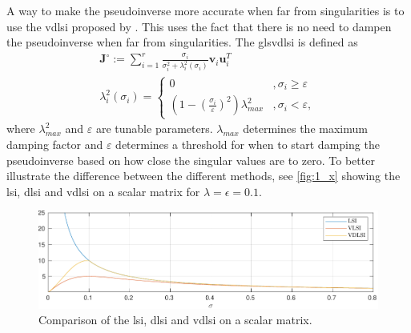 A way to make the pseudoinverse more accurate when far from singularities is to
use the \gls{vdlsi} proposed by \cite{chiaverini1997}.
This uses the fact that there is no need to dampen the pseudoinverse when far from singularities.
The gls{vdlsi} is defined as
\begin{subequations}
\begin{align}
    \bm{J}^{\circ} := \sum_{i=1}^r \frac{\sigma_i}{\sigma_i^2 + \lambda_i^2(\sigma_i)} \bm{v}_i \bm{u}_i^T \\
    \lambda_i^2(\sigma_i) = \begin{cases}
        0 & ,\sigma_i \geq \varepsilon \\
        \left(1-\left(\frac{\sigma_i}{\varepsilon}\right)^2\right)\lambda_{max}^2 & ,\sigma_i < \varepsilon,
    \end{cases}
\end{align}
\end{subequations}
where $\lambda_{max}^2$ and $\varepsilon$ are tunable parameters. $\lambda_{max}$
determines the maximum damping factor and $\varepsilon$ determines a threshold for when
to start damping the pseudoinverse based on how close the singular values are to zero.
To better illustrate the difference between the different methods, see \autoref{fig:1_x}
showing the \gls{lsi}, \gls{dlsi} and \gls{vdlsi} on a scalar matrix for $\lambda=\epsilon=0.1$.

\begin{figure}[h]
    \centering
    \includegraphics[width=\textwidth]{assets/singval.pdf}
    \caption{Comparison of the \gls{lsi}, \gls{dlsi} and \gls{vdlsi} on a scalar matrix.}
    \label{fig:1_x}
\end{figure}



